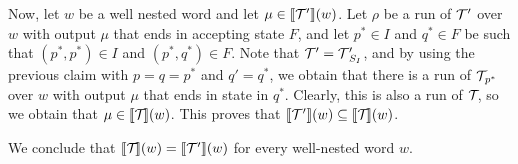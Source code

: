 	Now, let $w$ be a well nested word and let $\mu\in {\llbracket{\mathcal{T}\!\,'}\rrbracket}(w)$.
	Let $\rho$ be a run of $\mathcal{T}\!\,'$ over $w$ with output $\mu$ that ends in accepting state $F$, and let $p^*\in I$ and $q^*\in F$ be such that $(p^*,p^*)\in I$ and $(p^*,q^*)\in F$. Note that $\mathcal{T}\!\,' = \mathcal{T}\!\,'_{S_I}$, and by using the previous claim with $p = q = p^*$ and $q' = q^*$, we obtain that there is a run of $\mathcal{T}\!_{p^*}$ over $w$ with output $\mu$ that ends in state in $q^*$. Clearly, this is also a run of $\mathcal{T}\!$, so we obtain that $\mu\in{\llbracket{\mathcal{T}\!}\rrbracket}(w)$. 
	This proves that $\llbracket \mathcal{T}\!\,' \rrbracket(w) \subseteq \llbracket \mathcal{T}\! \rrbracket(w)$.
	
	We conclude that $\llbracket \mathcal{T}\! \rrbracket(w) = \llbracket \mathcal{T}\!\,' \rrbracket(w)$ for every well-nested word $w$. \hfill
